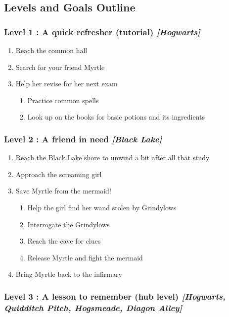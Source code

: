 \pagebreak

\subsection*{Levels and Goals Outline}

\subsubsection*{Level 1 : A quick refresher (tutorial) \textit{[Hogwarts]}}
\begin{enumerate}[1)]
	\item Reach the common hall
	\item Search for your friend Myrtle
	\item Help her revise for her next exam
	\begin{enumerate}[1.]
		\item Practice common spells
		\item Look up on the books for basic potions and its ingredients
	\end{enumerate}
\end{enumerate}

\subsubsection*{Level 2 : A friend in need \textit{[Black Lake]}}
\begin{enumerate}[1)]
	\item Reach the Black Lake shore to unwind a bit after all that study
	\item Approach the screaming girl
	\item Save Myrtle from the mermaid!
	\begin{enumerate}[1.]
		\item Help the girl find her wand stolen by Grindylows
		\item Interrogate the Grindylows
		\item Reach the cave for clues
		\item Release Myrtle and fight the mermaid
	\end{enumerate}
	\item Bring Myrtle back to the infirmary
\end{enumerate}

\subsubsection*{Level 3 : A lesson to remember (hub level) \textit{[Hogwarts, Quidditch Pitch, Hogsmeade, Diagon Alley]}}

